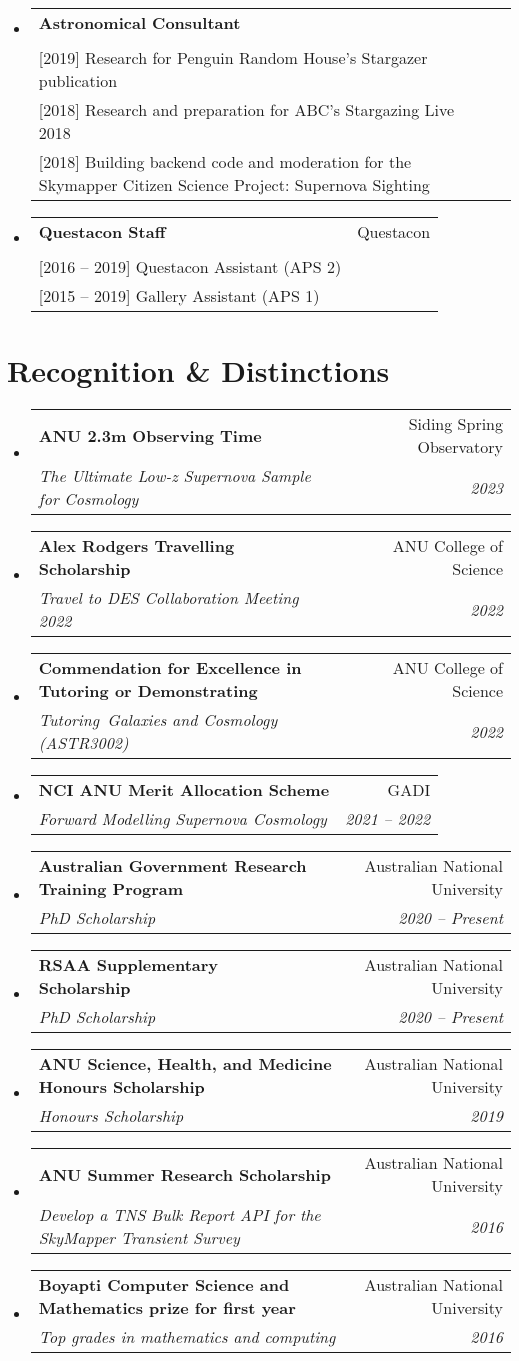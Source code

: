 \documentclass[letterpaper,11pt]{article}
\makeatletter
\newcommand{\resumeItem}[1]{
  \item\small{
    {#1 \vspace{-2pt}}
  }
}
\newcommand{\resumeSubheading}[4]{
  \vspace{-2pt}\item
    \begin{tabular*}{0.97\textwidth}[t]{l@{\extracolsep{\fill}}r}
      \textbf{#1} & #2 \\
      \textit{\small#3} & \textit{\small #4} \\
    \end{tabular*}\vspace{-7pt}
}
\newcommand{\resumeSubHeadingListStart}{\begin{itemize}[leftmargin=0.15in, label={}]}
\newcommand{\resumeSubHeadingListEnd}{\end{itemize}}
\newcommand{\resumeItemListStart}{\begin{itemize}}
\newcommand{\resumeItemListEnd}{\end{itemize}\vspace{-5pt}}
\newcommand{\experienceElement}[5]{%
    \resumeSubHeadingListStart
        \resumeSubheading
            {#1}
            {#2}
            {\makecell[l]{#3}}
            {#4}
            {#5}
    \resumeSubHeadingListEnd
}
\newcommand{\awardElement}[5]{%
    \resumeSubHeadingListStart
        \resumeSubheading
            {#1}
            {#2}
            {#3}
            {#4}
            \ifthenelse{\isempty{#5}}{}{%
                \resumeItemListStart
                    \renewcommand*{\do}[1]{\resumeItem{##1}}
                    \docsvlist{#5}%
                \resumeItemListEnd
            }%
    \resumeSubHeadingListEnd
}
\makeatother
\begin{document}
    \experienceElement{Astronomical Consultant}{}{[2020] Research for Questacon's Australia in Space exhibition\\{}[2019] Research for Penguin Random House's Stargazer publication\\{}[2018] Research and preparation for ABC's Stargazing Live 2018\\{}[2018] Building backend code and moderation for the Skymapper Citizen Science Project: Supernova Sighting}{}{}
    \experienceElement{Questacon Staff}{Questacon}{[2019 -- 2020] Learning Programs Presenter (APS 4)\\{}[2016 -- 2019] Questacon Assistant (APS 2)\\{}[2015 -- 2019] Gallery Assistant (APS 1)}{}{}


\section{Recognition \& Distinctions}

    \awardElement{ANU 2.3m Observing Time}{Siding Spring Observatory}{The Ultimate Low-z Supernova Sample for Cosmology}{2023}{}

    \awardElement{Alex Rodgers Travelling Scholarship}{ANU College of Science}{Travel to DES Collaboration Meeting 2022}{2022}{}
    
    \awardElement{Commendation for Excellence in Tutoring or Demonstrating}{ANU College of Science}{Tutoring~\textit{Galaxies and Cosmology (ASTR3002)}}{2022}{}

    \awardElement{NCI ANU Merit Allocation Scheme}{GADI}{Forward Modelling Supernova Cosmology}{2021 -- 2022}{}
    
    \awardElement{Australian Government Research Training Program}{Australian National University}{PhD Scholarship}{2020 -- Present}{}
    
    \awardElement{RSAA Supplementary Scholarship}{Australian National University}{PhD Scholarship}{2020 -- Present}{}
    
    \awardElement{ANU Science, Health, and Medicine Honours Scholarship}{Australian National University}{Honours Scholarship}{2019}{}
    
    \awardElement{ANU Summer Research Scholarship}{Australian National University}{Develop a TNS Bulk Report API for the SkyMapper Transient Survey}{2016}{}
    
    \awardElement{Boyapti Computer Science and Mathematics prize for first year}{Australian National University}{Top grades in mathematics and computing}{2016}{}
\end{document}
